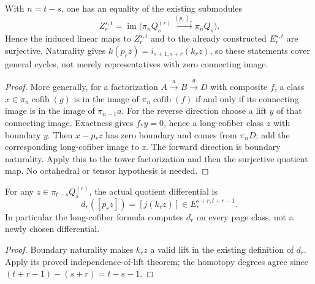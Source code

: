 \begin{proposition}
  \label{prop:h6-tower-long-layer-cycles}
  \leanok
  With $n=t-s$, one has an equality of the existing submodules
  \[
    Z_r^{s,t}=\operatorname{im}\bigl(\pi_nQ_s^{(r)}
        \xrightarrow{(p_r)_*}\pi_nQ_s\bigr).
  \]
  Hence the induced linear maps to $Z_r^{s,t}$ and to the already
  constructed $E_r^{s,t}$ are surjective. Naturality gives
  $k(p_rz)=i_{s+1,s+r}(k_rz)$, so these statements cover general cycles,
  not merely representatives with zero connecting image.
\end{proposition}
\begin{proof}
  More generally, for a factorization $A\xrightarrow{a}B\xrightarrow{g}D$
  with composite $f$, a class $x\in\pi_n\operatorname{cofib}(g)$ is in
  the image of $\pi_n\operatorname{cofib}(f)$ if and only if its
  connecting image is in the image of $\pi_{n-1}a$.
  For the reverse direction choose a lift $y$ of that connecting image.
  Exactness gives $f_*y=0$, hence a long-cofiber class $z$ with boundary
  $y$. Then $x-p_*z$ has zero boundary and comes from $\pi_nD$; add
  the corresponding long-cofiber image to $z$. The forward direction
  is boundary naturality. Apply this to the tower factorization and
  then the surjective quotient map. No octahedral or tensor hypothesis
  is needed.
  \leanok
\end{proof}

\begin{proposition}
  \label{prop:h6-tower-long-layer-differential}
  \leanok
  For any $z\in\pi_{t-s}Q_s^{(r)}$, the actual quotient differential is
  \[
    d_r([p_rz])=[j(k_rz)]\in E_r^{s+r,t+r-1}.
  \]
  In particular the long-cofiber formula computes $d_r$ on every page
  class, not a newly chosen differential.
\end{proposition}
\begin{proof}
  Boundary naturality makes $k_rz$ a valid lift in the existing
  definition of $d_r$. Apply its proved independence-of-lift theorem;
  the homotopy degrees agree since $(t+r-1)-(s+r)=t-s-1$.
  \leanok
\end{proof}

